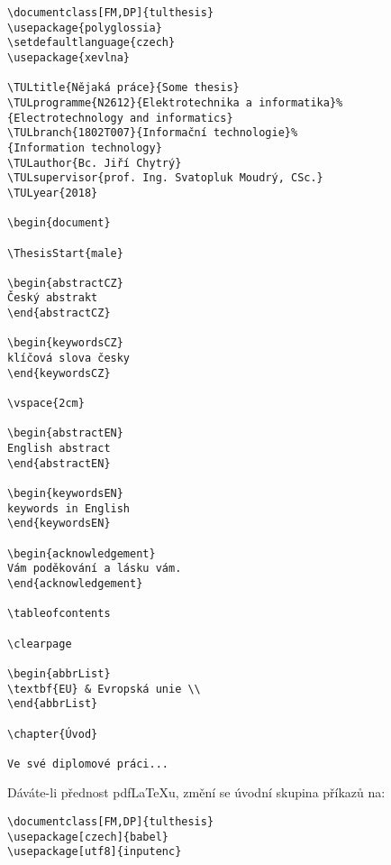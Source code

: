\documentclass[FM,BP]{tulthesis}
\newenvironment{myquote}{\begin{list}{}{\setlength\leftmargin\parindent}\item[]}{\end{list}}
\newenvironment{listing}{\begin{myquote}\color{\tulcolor}}{\end{myquote}}
\begin{document}
\begin{listing}
\begin{verbatim}
\documentclass[FM,DP]{tulthesis}
\usepackage{polyglossia}
\setdefaultlanguage{czech}
\usepackage{xevlna}

\TULtitle{Nějaká práce}{Some thesis}
\TULprogramme{N2612}{Elektrotechnika a informatika}%
{Electrotechnology and informatics}
\TULbranch{1802T007}{Informační technologie}%
{Information technology}
\TULauthor{Bc. Jiří Chytrý}
\TULsupervisor{prof. Ing. Svatopluk Moudrý, CSc.}
\TULyear{2018}

\begin{document}

\ThesisStart{male}

\begin{abstractCZ}
Český abstrakt
\end{abstractCZ}

\begin{keywordsCZ}
klíčová slova česky
\end{keywordsCZ}

\vspace{2cm}

\begin{abstractEN}
English abstract
\end{abstractEN}

\begin{keywordsEN}
keywords in English
\end{keywordsEN}

\begin{acknowledgement}
Vám poděkování a lásku vám.
\end{acknowledgement}

\tableofcontents

\clearpage

\begin{abbrList}
\textbf{EU} & Evropská unie \\
\end{abbrList}

\chapter{Úvod}

Ve své diplomové práci...
\end{verbatim}
\end{listing}

Dáváte-li přednost pdf\LaTeX u, změní se úvodní skupina příkazů na:

\begin{listing}
\begin{verbatim}
\documentclass[FM,DP]{tulthesis}
\usepackage[czech]{babel}
\usepackage[utf8]{inputenc}
\end{verbatim}
\end{listing}
\end{document}

